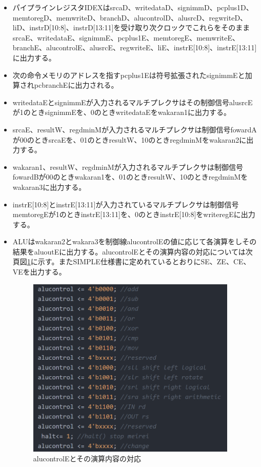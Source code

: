 \documentclass[a4paper,11pt,oneside,openany]{jsarticle}
\begin{document}
\begin{itemize}
 \item パイプラインレジスタIDEXはsrcaD、writedataD、signimmD、pcplus1D、memtoregD、memwriteD、branchD、alucontrolD、alusrcD、regwriteD、liD、instrD[10:8]、instrD[13:11]を受け取り次クロックでこれらをそのままsrcaE、writedataE、signimmE、pcplus1E、memtoregE、memwriteE、branchE、alucontrolE、alusrcE、regwriteE、liE、instrE[10:8]、instrE[13:11]に出力する。
\item 次の命令メモリのアドレスを指すpcplus1Eは符号拡張されたsignimmEと加算されpcbranchEに出力される。
\item writedataEとsignimmEが入力されるマルチプレクサはその制御信号alusrcEが1のときsignimmEを、0のときwritedataEをwakaran1に出力する。
\item srcaE、resultW、regdminMが入力されるマルチプレクサは制御信号fowardAが00のときsrcaEを、01のときresultW、10のときregdminMをwakaran2に出力する。
\item wakaran1、resultW、regdminMが入力されるマルチプレクサは制御信号fowardBが00のときwakaran1を、01のときresultW、10のときregdminMをwakaran3に出力する。
 \item instrE[10:8]とinstrE[13:11]が入力されているマルチプレクサは制御信号memtoregEが1のときinstrE[13:11]を、0のときinstrE[10:8]をwriteregEに出力する。
\item ALUはwakaran2とwakara3を制御線alucontrolEの値に応じて各演算をしその結果をaluoutEに出力する。alucontrolEとその演算内容の対応については次頁図\ref{alu}に示す。またSIMPLE仕様書に定めれているとおりにSE、ZE、CE、VEを出力する。
\begin{figure}[h]
  \centering
  \includegraphics[width=10cm]{alucontrol.png}
  \caption{alucontrolEとその演算内容の対応}
  \label{alu}
\end{figure}


\end{itemize}
\end{document}
